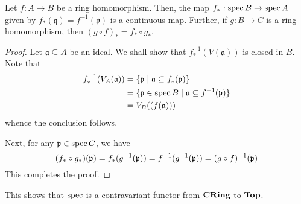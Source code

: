 \begin{proposition}
    Let $f: A\to B$ be a ring homomorphism. Then, the map $f_*:\operatorname{spec} B\to\operatorname{spec} A$ given by $f_*(\mathfrak q) = f^{-1}(\mathfrak p)$ is a continuous map. Further, if $g: B\to C$ is a ring homomorphism, then $(g\circ f)_* = f_*\circ g_*$.
\end{proposition}
\begin{proof}
    Let $\mathfrak a\subseteq A$ be an ideal. We shall show that $f_*^{-1}(V(\mathfrak a))$ is closed in $B$. Note that 
    \begin{align*}
        f_*^{-1}(V_A(\mathfrak a)) &= \{\mathfrak p\mid \mathfrak a\subseteq f_*(\mathfrak p)\}\\
        &= \{\mathfrak p\in\operatorname{spec} B\mid\mathfrak a\subseteq f^{-1}(\frak p)\}\\
        &= V_B((f(\mathfrak a)))
    \end{align*}
    whence the conclusion follows.

    Next, for any $\mathfrak p\in\operatorname{spec} C$, we have 
    \begin{equation*}
        (f_*\circ g_*)(\mathfrak p) = f_*(g^{-1}(\mathfrak p)) = f^{-1}(g^{-1}(\mathfrak p)) = (g\circ f)^{-1}(\mathfrak p)
    \end{equation*}
    This completes the proof.
\end{proof}

This shows that $\operatorname{spec}$ is a contravariant functor from $\mathbf{CRing}$ to $\mathbf{Top}$. 

